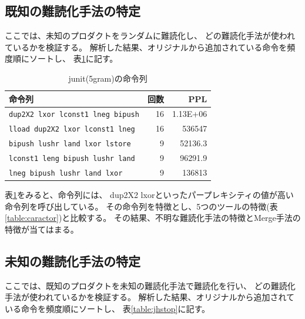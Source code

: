 \documentclass[a4j,fleqn,10pt]{jarticle}
\begin{document}
\subsection{既知の難読化手法の特定}
ここでは、未知のプロダクトをランダムに難読化し、
どの難読化手法が使われているかを検証する。
解析した結果、オリジナルから追加されている命令を頻度順にソートし、
表\ref{table:junit}に記す。
\begin{table}[t]
  \centering
  \footnotesize{
    \caption{junit(5gram)の命令列}\label{table:junit}
  \begin{tabular}{lrr}
    命令列 & 
    \multicolumn{1}{p{1cm}}{回数} & 
    \multicolumn{1}{p{1cm}}{PPL} \\ \hline
    \texttt{dup2X2 lxor lconst1 lneg bipush}     & 16 & 1.13E+06 \\
    \texttt{lload dup2X2 lxor lconst1 lneg}      & 16 & 536547 \\
    \texttt{bipush lushr land lxor lstore}       &  9 & 52136.3 \\
    \texttt{lconst1 leng bipush lushr land}      &  9 & 96291.9 \\
    \texttt{lneg bipush lushr land lxor}         &  9 & 136813 \\
  \end{tabular}}
\end{table}

表\ref{table:junit}をみると、命令列には、
dup2X2 lxorといったパープレキシティの値が高い命令列を呼び出している。
その命令列を特徴とし、5つのツールの特徴(表\ref{table:caractor})と比較する。
その結果、不明な難読化手法の特徴とMerge手法の特徴が当てはまる。

\subsection{未知の難読化手法の特定}
ここでは、既知のプロダクトを未知の難読化手法で難読化を行い、
どの難読化手法が使われているかを検証する。
解析した結果、オリジナルから追加されている命令を頻度順にソートし、
表\ref{table:jhstop}に記す。
\end{document}

